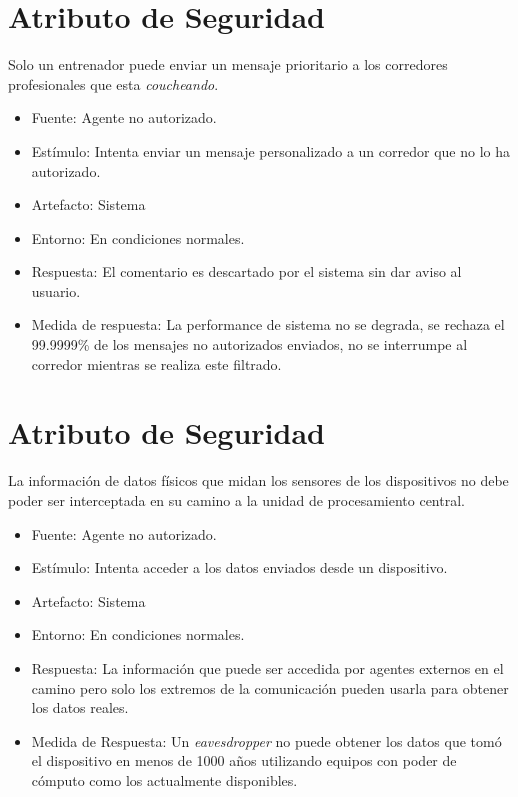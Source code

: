\section{Atributo de Seguridad}

Solo un entrenador puede enviar un mensaje prioritario a los corredores
profesionales que esta \emph{coucheando}.

\begin{itemize}
\itemsep1pt\parskip0pt
\item
  Fuente: Agente no autorizado.
\item
  Estímulo: Intenta enviar un mensaje personalizado a un corredor que no
  lo ha autorizado.
\item
  Artefacto: Sistema
\item
  Entorno: En condiciones normales.
\item
  Respuesta: El comentario es descartado por el sistema sin dar aviso al
  usuario.
\item
  Medida de respuesta: La performance de sistema no se degrada, se
  rechaza el 99.9999\% de los mensajes no autorizados enviados, no se
  interrumpe al corredor mientras se realiza este filtrado.
\end{itemize}

\section{Atributo de Seguridad}

La información de datos físicos que midan los sensores de los
dispositivos no debe poder ser interceptada en su camino a la unidad de
procesamiento central.

\begin{itemize}
\itemsep1pt\parskip0pt
\item
  Fuente: Agente no autorizado.
\item
  Estímulo: Intenta acceder a los datos enviados desde un dispositivo.
\item
  Artefacto: Sistema
\item
  Entorno: En condiciones normales.
\item
  Respuesta: La información que puede ser accedida por agentes externos
  en el camino pero solo los extremos de la comunicación pueden usarla
  para obtener los datos reales.
\item
  Medida de Respuesta: Un \emph{eavesdropper} no puede obtener los datos
  que tomó el dispositivo en menos de 1000 años utilizando equipos con
  poder de cómputo como los actualmente disponibles.
\end{itemize}

